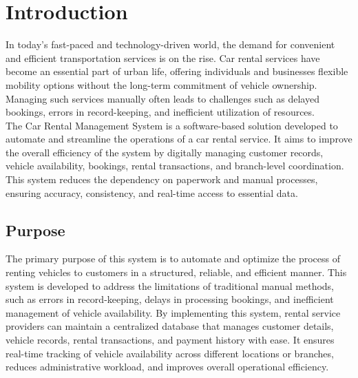 \documentclass[12pt,a4paper]{report}
\begin{document}
\renewcommand{\contentsname}{Table of Contents}
\tableofcontents
{}
\listoffigures
{}


\pagestyle{fancy}
\fancyhf{}
\renewcommand{\headrulewidth}{0.5pt}
\renewcommand{\footrulewidth}{0.5pt}


\chapter{Introduction}
\par
In today’s fast-paced and technology-driven world, the demand for convenient and efficient transportation services is on the rise. Car rental services have become an essential part of urban life, offering individuals and businesses flexible mobility options without the long-term commitment of vehicle ownership. Managing such services manually often leads to challenges such as delayed bookings, errors in record-keeping, and inefficient utilization of resources. 
\\
\para\noindent The Car Rental Management System is a software-based solution developed to automate and streamline the operations of a car rental service. It aims to improve the overall efficiency of the system by digitally managing customer records, vehicle availability, bookings, rental transactions, and branch-level coordination. This system reduces the dependency on paperwork and manual processes, ensuring accuracy, consistency, and real-time access to essential data.
\par
\section{Purpose}
The primary purpose of this system is to automate and optimize the process of renting vehicles to customers in a structured, reliable, and efficient manner. This system is developed to address the limitations of traditional manual methods, such as errors in record-keeping, delays in processing bookings, and inefficient management of vehicle availability. By implementing this system, rental service providers can maintain a centralized database that manages customer details, vehicle records, rental transactions, and payment history with ease. It ensures real-time tracking of vehicle availability across different locations or branches, reduces administrative workload, and improves overall operational efficiency.
\end{document}
